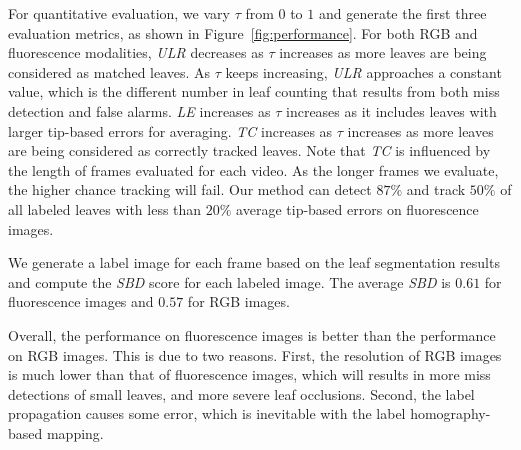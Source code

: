For quantitative evaluation, we vary $\tau$ from $0$ to $1$ and generate the first three evaluation metrics, as shown in Figure~\ref{fig:performance}.
For both RGB and fluorescence modalities, {\it{ULR}} decreases as $\tau$ increases as more leaves are being considered as matched leaves.
As $\tau$ keeps increasing, {\it{ULR}} approaches a constant value, which is the different number in leaf counting that results from both miss detection and false alarms.
{\it{LE}} increases as $\tau$ increases as it includes leaves with larger tip-based errors for averaging.
{\it{TC}} increases as $\tau$ increases as more leaves are being considered as correctly tracked leaves.
Note that {\it{TC}} is influenced by the length of frames evaluated for each video.
As the longer frames we evaluate, the higher chance tracking will fail.
Our method can detect $87\%$ and track $50\%$ of all labeled leaves with less than $20\%$ average tip-based errors on fluorescence images.

We generate a label image for each frame based on the leaf segmentation results and compute the {\it{SBD}} score for each labeled image.
The average {\it{SBD}} is $0.61$ for fluorescence images and $0.57$ for RGB images.

Overall, the performance on fluorescence images is better than the performance on RGB images.
This is due to two reasons.
First, the resolution of RGB images is much lower than that of fluorescence images, which will results in more miss detections of small leaves, and more severe leaf occlusions.
Second, the label propagation causes some error, which is inevitable with the label homography-based mapping.











